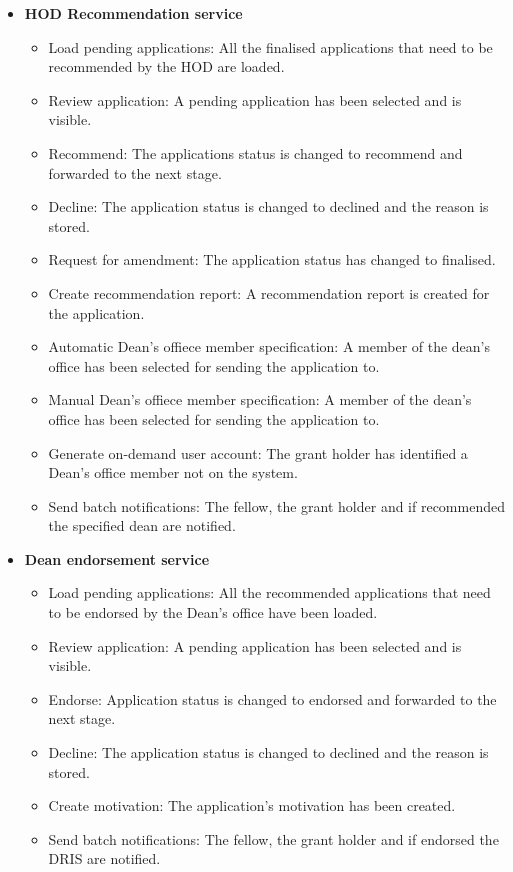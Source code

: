 \documentclass[12pt]{article}
\begin{document}
\begin{itemize}
	\item \textbf{HOD Recommendation service}
		\begin{itemize}
			\item Load pending applications: All the finalised applications that need to be recommended by the HOD are loaded.
			\item Review application: A pending application has been selected and is visible.
			\item Recommend: The applications status is changed to recommend and forwarded to the next stage.
			\item Decline: The application status is changed to declined and the reason is stored.
			\item Request for amendment: The application status has changed to finalised. 
			\item Create recommendation report: A recommendation report is created for the application.				
			\item Automatic Dean's offiece member specification: A member of the dean's office has been selected for sending the application to.
			\item Manual Dean's offiece member specification: A member of the dean's office has been selected for sending the application to.
			\item Generate on-demand user account: The grant holder has identified a Dean's office member not on the system.			
			\item Send batch notifications: The fellow, the grant holder and if recommended the specified dean are notified.										
		\end{itemize}
		
	\item \textbf{Dean endorsement service}
		\begin{itemize}
			\item Load pending applications: All the recommended applications that need to be endorsed by the Dean's office have been loaded.
			\item Review application: A pending application has been selected and is visible.
			\item Endorse: Application status is changed to endorsed and forwarded to the next stage.  
			\item Decline: The application status is changed to declined and the reason is stored.	
			\item Create motivation: The application's motivation has been created.			
			\item Send batch notifications: The fellow, the grant holder and if endorsed the DRIS are notified.									
		\end{itemize}
	

\end{itemize}
\end{document}
